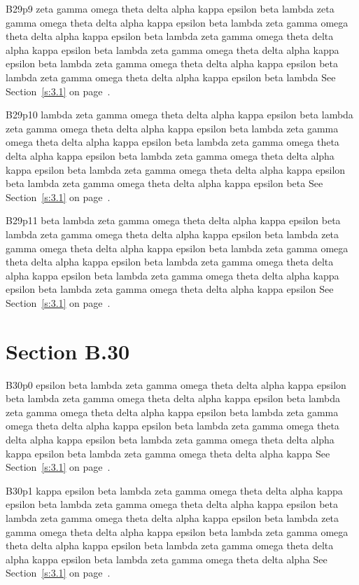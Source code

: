 B29p9 zeta gamma omega theta delta alpha kappa epsilon beta lambda zeta gamma omega theta delta alpha kappa epsilon beta lambda zeta gamma omega theta delta alpha kappa epsilon beta lambda zeta gamma omega theta delta alpha kappa epsilon beta lambda zeta gamma omega theta delta alpha kappa epsilon beta lambda zeta gamma omega theta delta alpha kappa epsilon beta lambda zeta gamma omega theta delta alpha kappa epsilon beta lambda See Section~\ref{s:3.1} on page~\pageref{s:3.1}.

B29p10 lambda zeta gamma omega theta delta alpha kappa epsilon beta lambda zeta gamma omega theta delta alpha kappa epsilon beta lambda zeta gamma omega theta delta alpha kappa epsilon beta lambda zeta gamma omega theta delta alpha kappa epsilon beta lambda zeta gamma omega theta delta alpha kappa epsilon beta lambda zeta gamma omega theta delta alpha kappa epsilon beta lambda zeta gamma omega theta delta alpha kappa epsilon beta See Section~\ref{s:3.1} on page~\pageref{s:3.1}.

B29p11 beta lambda zeta gamma omega theta delta alpha kappa epsilon beta lambda zeta gamma omega theta delta alpha kappa epsilon beta lambda zeta gamma omega theta delta alpha kappa epsilon beta lambda zeta gamma omega theta delta alpha kappa epsilon beta lambda zeta gamma omega theta delta alpha kappa epsilon beta lambda zeta gamma omega theta delta alpha kappa epsilon beta lambda zeta gamma omega theta delta alpha kappa epsilon See Section~\ref{s:3.1} on page~\pageref{s:3.1}.

\section{Section B.30}\label{s:B.30}
B30p0 epsilon beta lambda zeta gamma omega theta delta alpha kappa epsilon beta lambda zeta gamma omega theta delta alpha kappa epsilon beta lambda zeta gamma omega theta delta alpha kappa epsilon beta lambda zeta gamma omega theta delta alpha kappa epsilon beta lambda zeta gamma omega theta delta alpha kappa epsilon beta lambda zeta gamma omega theta delta alpha kappa epsilon beta lambda zeta gamma omega theta delta alpha kappa See Section~\ref{s:3.1} on page~\pageref{s:3.1}.

B30p1 kappa epsilon beta lambda zeta gamma omega theta delta alpha kappa epsilon beta lambda zeta gamma omega theta delta alpha kappa epsilon beta lambda zeta gamma omega theta delta alpha kappa epsilon beta lambda zeta gamma omega theta delta alpha kappa epsilon beta lambda zeta gamma omega theta delta alpha kappa epsilon beta lambda zeta gamma omega theta delta alpha kappa epsilon beta lambda zeta gamma omega theta delta alpha See Section~\ref{s:3.1} on page~\pageref{s:3.1}.

